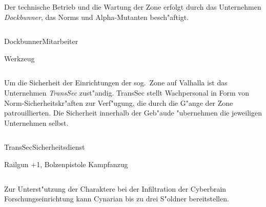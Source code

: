 
\begin{column}[l]{0.45}
    Der technische Betrieb und die Wartung der Zone erfolgt durch das Unternehmen \emph{Dockbunner}, das Norms und Alpha-Mutanten 
    besch"aftigt.
\end{column}
\begin{column}[r]{0.45}
    \begin{nscsheet}[h]{Dockbunner\newline{}Mitarbeiter}
        \nscstats[]
        \nscruler
        \begin{nscinventory}
            \nscitem[Waffen] Werkzeug
        \end{nscinventory}
    \end{nscsheet}
\end{column}    


\begin{column}[l]{0.45}
    Um die Sicherheit der Einrichtungen der sog.~Zone auf Valhalla ist das Unternehmen \emph{TransSec} zust"andig. TransSec stellt
    Wachpersonal in Form von Norm-Sicherheitskr"aften zur Verf"ugung, die durch die G"ange der Zone patrouillierten. Die Sicherheit
    innerhalb der Geb"aude "ubernehmen die jeweiligen Unternehmen selbst.
\end{column}
\begin{column}[r]{0.45}
    \begin{nscsheet}[h]{TransSec\newline{}Sicherheitsdienst}
        \nscstats[ATT=2,AGG=2]
        \nscruler
        \begin{nscinventory}
            \nscitem[Waffen] Railgun +1, Bolzenpistole
            \nscitem[R"ustung] Kampfanzug
        \end{nscinventory}
    \end{nscsheet}
\end{column}
\vfill

\pagebreak
{}

Zur Unterst"utzung der Charaktere bei der Infiltration der Cyberbrain Forschungseinrichtung kann Cynarian bis zu 
drei S"oldner bereitstellen.

